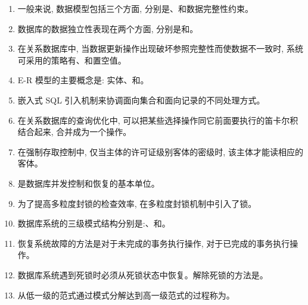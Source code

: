 \documentclass{ctexart} %
\begin{document}
\begin{enumerate}[label=\arabic*.] %
    \item 一般来说, 数据模型包括三个方面, 分别是\underline{\hspace{2cm}}、\underline{\hspace{2cm}}和数据完整性约束。
    \item 数据库的数据独立性表现在两个方面, 分别是\underline{\hspace{2cm}}和\underline{\hspace{2cm}}。
    \item 在关系数据库中, 当数据更新操作出现破坏参照完整性而使数据不一致时, 系统可采用的策略有\underline{\hspace{2cm}}、\underline{\hspace{2cm}}和置空值。
    \item E-R 模型的主要概念是: 实体、\underline{\hspace{2cm}}和\underline{\hspace{2cm}}。
    \item 嵌入式 SQL 引入\underline{\hspace{2cm}}机制来协调面向集合和面向记录的不同处理方式。
    \item 在关系数据库的查询优化中, 可以把某些选择操作同它前面要执行的笛卡尔积结合起来, 合并成为一个\underline{\hspace{2cm}}操作。
    \item 在强制存取控制中, 仅当主体的许可证级别\underline{\hspace{2cm}}客体的密级时, 该主体才能读相应的客体。
    \item \underline{\hspace{2cm}}是数据库并发控制和恢复的基本单位。
    \item 为了提高多粒度封锁的检查效率, 在多粒度封锁机制中引入了\underline{\hspace{2cm}}锁。
    \item 数据库系统的三级模式结构分别是:\underline{\hspace{2cm}}、\underline{\hspace{2cm}}和\underline{\hspace{2cm}}。
    \item 恢复系统故障的方法是对于未完成的事务执行\underline{\hspace{2cm}}操作, 对于已完成的事务执行\underline{\hspace{2cm}}操作。
    \item 数据库系统遇到死锁时必须从死锁状态中恢复。解除死锁的方法是\underline{\hspace{4cm}}。
    \item 从低一级的范式通过模式分解达到高一级范式的过程称为\underline{\hspace{4cm}}。
\end{enumerate}
\end{document}
